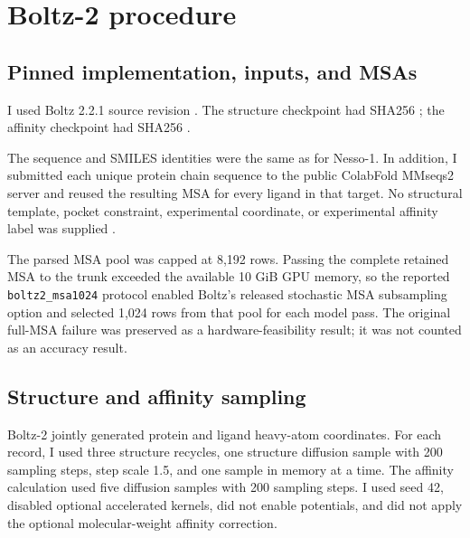 \documentclass[11pt]{article}
\begin{document}
\section{Boltz-2 procedure}

\subsection{Pinned implementation, inputs, and MSAs}

I used Boltz 2.2.1 source revision
\texttt{}. The structure checkpoint
 had SHA256
\texttt{};
the affinity checkpoint  had SHA256
\texttt{}.

The sequence and SMILES identities were the same as for Nesso-1. In addition,
I submitted each unique protein chain sequence to the public ColabFold
MMseqs2 server and reused the resulting MSA for every ligand in that target.
No structural template, pocket constraint, experimental coordinate, or
experimental affinity label was supplied \citep{passaro2025boltz2}.

The parsed MSA pool was capped at 8,192 rows. Passing the complete retained MSA
to the trunk exceeded the available 10 GiB GPU memory, so the reported
\texttt{boltz2\_msa1024} protocol enabled Boltz's released stochastic MSA
subsampling option and selected 1,024 rows from that pool for each model pass.
The original full-MSA failure was preserved as a hardware-feasibility result;
it was not counted as an accuracy result.

\subsection{Structure and affinity sampling}

Boltz-2 jointly generated protein and ligand heavy-atom coordinates. For each
record, I used three structure recycles, one structure diffusion sample with
200 sampling steps, step scale 1.5, and one sample in memory at a time. The
affinity calculation used five diffusion samples with 200 sampling steps. I
used seed 42, disabled optional accelerated kernels, did not enable potentials,
and did not apply the optional molecular-weight affinity correction.
\end{document}
